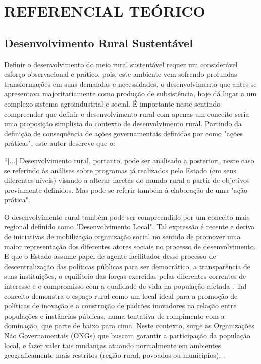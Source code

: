 \chapter{REFERENCIAL TEÓRICO}

\section{Desenvolvimento Rural Sustentável}

Definir o desenvolvimento do meio rural sustentável requer um considerável esforço observacional e prático, pois, este ambiente vem sofrendo profundas transformações em suas demandas e necessidades, o desenvolvimento que antes se apresentava majoritariamente como produção de subsistência, hoje dá lugar a um complexo sistema agroindustrial \cite{bastos_determinantes_2018} e social. É importante neste sentindo compreender que definir o desenvolvimento rural com apenas um conceito seria uma proposição simplista do contexto de desenvolvimento rural. Partindo da definição de consequência de ações governamentais definidas por  como "ações práticas", este autor descreve que o:

\begin{citacao}
“[...] Desenvolvimento rural, portanto, pode ser analisado a posteriori, neste caso se referindo às análises sobre programas já realizados pelo Estado (em seus diferentes níveis) visando a alterar facetas do mundo rural a partir de objetivos previamente definidos. Mas pode se referir também à elaboração de uma "ação prática".
\end{citacao}

O desenvolvimento rural também pode ser compreendido por um conceito mais regional definido como "Desenvolvimento Local". Tal expressão é recente e deriva de iniciativas de mobilização organização social no sentido de promover uma maior representação dos diferentes atores sociais no processo de desenvolvimento. E que o Estado assume papel de agente facilitador desse processo de descentralização das políticas públicas  para ser democrático, a transparência de suas instituições, o equilíbrio das forças exercidas pelas diferentes correntes de interesse e o compromisso com a qualidade de vida na população afetada \cite{campanhola_diretrizes_2000}. Tal conceito demonstra o espaço rural como um local ideal para a promoção de políticas de inovação e a construção de padrões inovadores na relação entre populações e instâncias públicas, numa tentativa de rompimento com a dominação, que parte de baixo para cima. Neste contexto, surge as Organizações Não Governamentais (ONGs) que buscam garantir a participação da população local, e fazer valer tais mudanças atuando normalmente em ambientes geograficamente mais restritos (região rural, povoados ou municípios), \cite{assis_agricultura_2005, campanhola_diretrizes_2000}.

